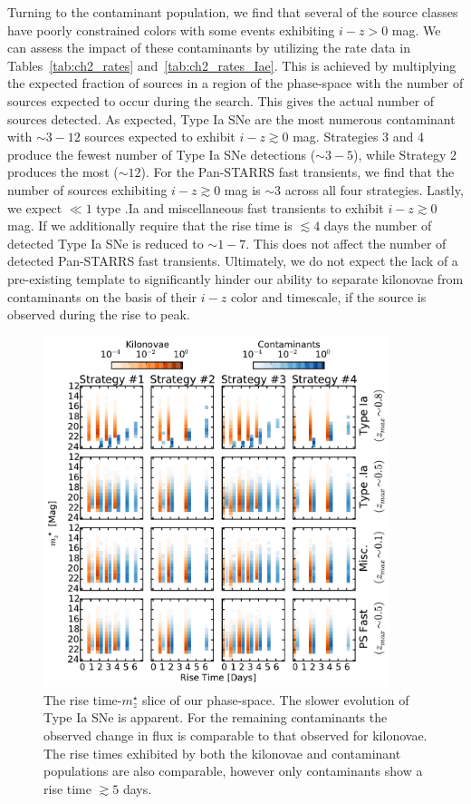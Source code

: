 Turning to the contaminant population, we find that several of the source classes have poorly constrained colors with some events exhibiting $i-z > 0$ mag. We can assess the impact of these contaminants by utilizing the rate data in Tables~\ref{tab:ch2_rates} and~\ref{tab:ch2_rates_Iae}. This is achieved by multiplying the expected fraction of sources in a region of the phase-space with the number of sources expected to occur during the search. This gives the actual number of sources detected. As expected, Type Ia SNe are the most numerous contaminant with $\sim3-12$ sources expected to exhibit $i-z\gtrsim0$ mag. Strategies 3 and 4 produce the fewest number of Type Ia SNe detections ($\sim 3-5$), while Strategy 2 produces the most ($\sim 12$). For the Pan-STARRS fast transients, we find that the number of sources exhibiting $i-z\gtrsim0$ mag is $\sim3$ across all four strategies. Lastly, we expect $\ll1$ type .Ia and miscellaneous fast transients to exhibit $i-z\gtrsim0$ mag. If we additionally require that the rise time is $\lesssim 4$ days the number of detected Type Ia SNe is reduced to $\sim1-7$. This does not affect the number of detected Pan-STARRS fast transients. Ultimately, we do not expect the lack of a pre-existing template to significantly hinder our ability to separate kilonovae from contaminants on the basis of their $i-z$ color and timescale, if the source is observed during the rise to peak.

\begin{figure}[t!]
\centering
\includegraphics[width=0.9\textwidth]{./figs/chapter2/ch2_f15.pdf}
\caption{The rise time-$m^{\star}_z$ slice of our phase-space. The slower evolution of Type Ia SNe is apparent. For the remaining contaminants the observed change in flux is comparable to that observed for kilonovae. The rise times exhibited by both the kilonovae and contaminant populations are also comparable, however only contaminants show a rise time $\gtrsim 5$ days.}
\label{fig:ch2_phaserisediff_df}
\end{figure}

